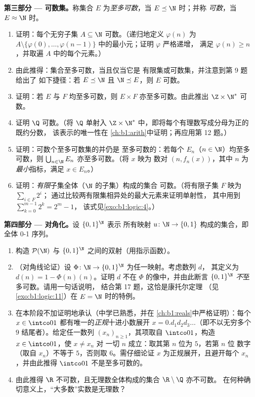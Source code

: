 \begin{problem}
\medskip
\noindent\textbf{第三部分 --- 可数集。}称集合 $E$
为\emph{至多可数}，当 $E \preceq \N$ 时；并称
\emph{可数}，当 $E \approx \N$ 时。
\begin{enumerate}[resume]
  \item 证明：每个无穷子集 $A \subseteq \N$
        可数。（递归地定义 $\varphi(n)$ 为
        $A \setminus \{\varphi(0), \dots,
        \varphi(n-1)\}$ 中的最小元；证明 $\varphi$ 严格递增，
        满足 $\varphi(n) \geq n$，并取遍
        $A$ 中的每个元素。）
  \item 由此推得：集合至多可数，当且仅当它是
        有限集或可数集，并注意到第 9 题给出了
        如下捷径：若 $E \preceq \N$ 且 $\N \preceq E$，则 $E$
        可数。
  \item 证明：若 $E$ 与 $F$ 均至多可数，则 $E
        \times F$ 亦至多可数。由此推出 $\Z \times \N^*$ 可数。
  \item 证明 $\Q$ 可数。（将 $\Q$ 单射入 $\Z \times
        \N^*$ 中，即将每个有理数写成分母为正的既约分数，
        该表示的唯一性在
        \cref{ch:b1:arith}中证明；再应用第 12 题。）
  \item 证明：可数个至多可数集的并仍是
        至多可数的：若每个 $E_n$（$n \in \N$）均至多可数，则
        $\bigcup_{n \in \N} E_n$ 亦至多可数。（将 $x$ 映为
        数对 $(n, f_n(x))$，其中 $n$ 为\emph{最小}指标，满足
        $x \in E_n$。）
  \item 证明：\emph{有限}子集全体（$\N$ 的子集）构成的集合
        可数。（将有限子集 $F$ 映为 $\sum_{i \in F} 2^i$；
        通过比较两有限集相异处的最大元素来证明单射性，
        其中用到 $\sum_{k=0}^{m-1} 2^k = 2^m - 1$，
        该式见\cref{exo:b1:logic:4}。）
\end{enumerate}

\medskip
\noindent\textbf{第四部分 --- 对角化。}设 $\{0,1\}^{\N}$ 表示
所有映射 $u \colon \N \to \{0, 1\}$ 构成的集合，即
全体 0-1 序列。
\begin{enumerate}[resume]
  \item 构造 $\mathcal{P}(\N)$ 与
        $\{0,1\}^{\N}$ 之间的双射（用指示函数）。
  \item （对角线论证）设 $\Phi \colon \N \to
        \{0,1\}^{\N}$ 为任一映射。考虑数列 $d$，
        其定义为 $d(n) = 1 - \Phi(n)(n)$。证明 $d$ 不在
        $\Phi$ 的像中，并由此断言 $\{0,1\}^{\N}$
        \emph{不}至多可数。请用一句话说明，
        结合第 17 题，这恰是康托尔定理
        （见\cref{exo:b1:logic:11}）在 $E = \N$ 时的特例。
  \item 在本阶段不加证明地承认（中学已熟悉，并在
        \cref{ch:b1:reals}中严格证明）：每个 $x \in
        \intco01$ 都有唯一的\emph{正规}十进小数展开 $x =
        0.d_1 d_2 d_3\dots$（即不以无穷多个
        $9$ 结尾者）。给定任一数列 $(x_n)_{n \geq 1}$，其项取自
        $\intco01$，构造 $x \in \intco01$，使 $x \neq x_n$ 对
        一切 $n$ 成立：取其第 $n$ 位为 $5$，若第 $n$ 位
        数字（取自 $x_n$）不等于 $5$，否则取 $6$。需仔细论证
        $x$ 为正规展开，且避开每个 $x_n$，并由此推得
        $\intco01$ 不是至多可数的。
  \item 由此推得 $\R$ 不可数，且无理数全体构成的集合 $\R
        \setminus \Q$ 亦不可数。
        在何种确切意义上，“大多数”实数是无理数？
\end{enumerate}


\end{problem}
